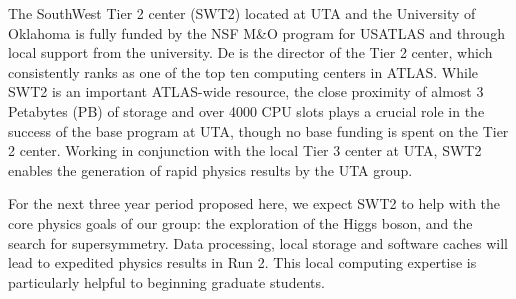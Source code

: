 
The SouthWest Tier 2 center (SWT2) located at UTA and the University of Oklahoma is fully 
funded by the NSF M\&O program for USATLAS and through local support from the university. 
De is the director of the Tier 2 center, which consistently ranks as one of the top ten 
computing centers in ATLAS. While SWT2 is an important ATLAS-wide resource, the close 
proximity of almost 3 Petabytes (PB) of storage and over 4000 CPU slots plays a crucial 
role in the success of the base program at UTA, though no base funding is spent on the 
Tier 2 center. Working in conjunction with the local Tier 3 center at UTA, SWT2 enables 
the generation of rapid physics results by the UTA group.

For the next three year period proposed here, we expect SWT2 to help with the core physics 
goals of our group: the exploration of the Higgs boson, and the search for supersymmetry. 
Data processing, local storage and software caches will lead to expedited physics results 
in Run 2. This local computing expertise is particularly helpful to beginning graduate students.
